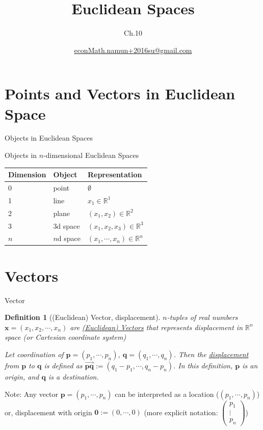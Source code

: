\documentclass[a4paper,11pt]{article}
\author[조남운]{\url{econMath.namun+2016su@gmail.com}}
\title{Euclidean Spaces}
\subtitle{Ch.10}
\newtheorem{defn}{Definition}
\begin{document}
	
\maketitle


\section{Points and Vectors in Euclidean Space} %
\label{sec:points_and_vectors_in_euclidean_space}
\begin{frame}[t]{Objects in Euclidean Spaces}
\begin{block}
	{Objects in $n$-dimensional Euclidean Spaces}
	\begin{tabular}
		{lll}
		Dimension & Object & Representation\\
		\hline\hline
		0 & point & $\emptyset$\\
		1 & line & $x_1\in \mathbb{R}^1$\\
		2 & plane & $(x_1,x_2)\in \mathbb{R}^2$\\
		3 & 3d space & $(x_1,x_2,x_3)\in \mathbb{R}^3$\\
		$n$ & $n$d space  & $(x_1,\cdots,x_n)\in\mathbb{R}^n$
	\end{tabular}
\end{block}
\end{frame}

\section{Vectors} %
\label{sec:vectors}

\begin{frame}[t]{Vector}
	\begin{defn}
		[(Euclidean) Vector, displacement]
		$n$-tuples of real numbers $\mathbf{x}=(x_1,x_2,\cdots,x_n)$ are \uline{(Euclidean) Vectors} that represents displacement in $\mathbb{R}^n$  space (or Cartesian coordinate system)
		
		Let coordination of $\mathbf{p}=(p_1,\cdots,p_n)$, $\mathbf{q}=(q_1,\cdots,q_n)$. Then the \uline{displacement} from $\mathbf{p}$ to $\mathbf{q}$ is defined as $\overrightarrow{\mathbf{pq}}:=(q_1-p_1,\cdots,q_n-p_n)$. In this definition, $\mathbf{p}$ is an origin, and $\mathbf{q}$ is a destination. 
	\end{defn}
	Note: Any vector $\mathbf{p}=(p_1,\cdots,p_n)$ can be interpreted as a location ($(p_1,\cdots,p_n)$) or, displacement with origin $\mathbf{0}:=(0,\cdots,0)$ (more explicit notation: $\begin{pmatrix}
		p_1 \\
		\vdots\\
		p_n
	\end{pmatrix}$)
\end{frame}
\end{document}

